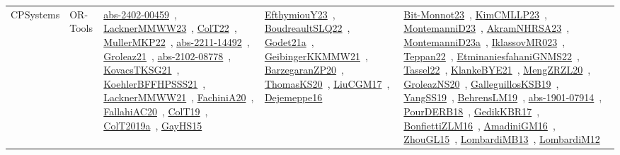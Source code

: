 {\begin{longtable}{lp{3cm}>{\raggedright\arraybackslash}p{6cm}>{\raggedright\arraybackslash}p{6cm}>{\raggedright\arraybackslash}p{8cm}}
\index{OR-Tools}\index{CPSystems!OR-Tools}CPSystems & OR-Tools & \href{../works/abs-2402-00459.pdf}{abs-2402-00459}~\cite{abs-2402-00459}, \href{../works/LacknerMMWW23.pdf}{LacknerMMWW23}~\cite{LacknerMMWW23}, \href{../works/ColT22.pdf}{ColT22}~\cite{ColT22}, \href{../works/MullerMKP22.pdf}{MullerMKP22}~\cite{MullerMKP22}, \href{../works/abs-2211-14492.pdf}{abs-2211-14492}~\cite{abs-2211-14492}, \href{../works/Groleaz21.pdf}{Groleaz21}~\cite{Groleaz21}, \href{../works/abs-2102-08778.pdf}{abs-2102-08778}~\cite{abs-2102-08778}, \href{../works/KovacsTKSG21.pdf}{KovacsTKSG21}~\cite{KovacsTKSG21}, \href{../works/KoehlerBFFHPSSS21.pdf}{KoehlerBFFHPSSS21}~\cite{KoehlerBFFHPSSS21}, \href{../works/LacknerMMWW21.pdf}{LacknerMMWW21}~\cite{LacknerMMWW21}, \href{../works/FachiniA20.pdf}{FachiniA20}~\cite{FachiniA20}, \href{../works/FallahiAC20.pdf}{FallahiAC20}~\cite{FallahiAC20}, \href{../works/ColT19.pdf}{ColT19}~\cite{ColT19}, \href{../works/ColT2019a.pdf}{ColT2019a}~\cite{ColT2019a}, \href{../works/GayHS15.pdf}{GayHS15}~\cite{GayHS15} & \href{../works/EfthymiouY23.pdf}{EfthymiouY23}~\cite{EfthymiouY23}, \href{../works/BoudreaultSLQ22.pdf}{BoudreaultSLQ22}~\cite{BoudreaultSLQ22}, \href{../works/Godet21a.pdf}{Godet21a}~\cite{Godet21a}, \href{../works/GeibingerKKMMW21.pdf}{GeibingerKKMMW21}~\cite{GeibingerKKMMW21}, \href{../works/BarzegaranZP20.pdf}{BarzegaranZP20}~\cite{BarzegaranZP20}, \href{../works/ThomasKS20.pdf}{ThomasKS20}~\cite{ThomasKS20}, \href{../works/LiuCGM17.pdf}{LiuCGM17}~\cite{LiuCGM17}, \href{../works/Dejemeppe16.pdf}{Dejemeppe16}~\cite{Dejemeppe16} & \href{../works/Bit-Monnot23.pdf}{Bit-Monnot23}~\cite{Bit-Monnot23}, \href{../works/KimCMLLP23.pdf}{KimCMLLP23}~\cite{KimCMLLP23}, \href{../works/MontemanniD23.pdf}{MontemanniD23}~\cite{MontemanniD23}, \href{../works/AkramNHRSA23.pdf}{AkramNHRSA23}~\cite{AkramNHRSA23}, \href{../works/MontemanniD23a.pdf}{MontemanniD23a}~\cite{MontemanniD23a}, \href{../works/IklassovMR023.pdf}{IklassovMR023}~\cite{IklassovMR023}, \href{../works/Teppan22.pdf}{Teppan22}~\cite{Teppan22}, \href{../works/EtminaniesfahaniGNMS22.pdf}{EtminaniesfahaniGNMS22}~\cite{EtminaniesfahaniGNMS22}, \href{../works/Tassel22.pdf}{Tassel22}~\cite{Tassel22}, \href{../works/KlankeBYE21.pdf}{KlankeBYE21}~\cite{KlankeBYE21}, \href{../works/MengZRZL20.pdf}{MengZRZL20}~\cite{MengZRZL20}, \href{../works/GroleazNS20.pdf}{GroleazNS20}~\cite{GroleazNS20}, \href{../works/GalleguillosKSB19.pdf}{GalleguillosKSB19}~\cite{GalleguillosKSB19}, \href{../works/YangSS19.pdf}{YangSS19}~\cite{YangSS19}, \href{../works/BehrensLM19.pdf}{BehrensLM19}~\cite{BehrensLM19}, \href{../works/abs-1901-07914.pdf}{abs-1901-07914}~\cite{abs-1901-07914}, \href{../works/PourDERB18.pdf}{PourDERB18}~\cite{PourDERB18}, \href{../works/GedikKBR17.pdf}{GedikKBR17}~\cite{GedikKBR17}, \href{../works/BonfiettiZLM16.pdf}{BonfiettiZLM16}~\cite{BonfiettiZLM16}, \href{../works/AmadiniGM16.pdf}{AmadiniGM16}~\cite{AmadiniGM16}, \href{../works/ZhouGL15.pdf}{ZhouGL15}~\cite{ZhouGL15}, \href{../works/LombardiMB13.pdf}{LombardiMB13}~\cite{LombardiMB13}, \href{../works/LombardiM12.pdf}{LombardiM12}~\cite{LombardiM12}\\

\end{longtable}}
